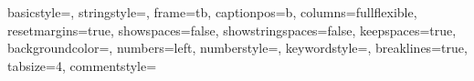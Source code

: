 \usepackage{color}
\usepackage{accsupp}
\usepackage{hyperref}
\usepackage[ngerman]{babel}
\usepackage[latin1]{inputenc} 

\usepackage{listings}
{
  basicstyle=\ttfamily, %
  stringstyle=\color{green}\ttfamily,
  frame=tb, %
  captionpos=b,
  columns=fullflexible, %
  resetmargins=true,
  showspaces=false, %
  showstringspaces=false, %
  keepspaces=true, %
  backgroundcolor=\color{bisque}, %
  numbers=left, %
  numberstyle=\noncopynumber, %
  keywordstyle=\color{blue}, %
  breaklines=true,
  tabsize=4,
  commentstyle=\color{brown}
}
\newcommand{\noncopynumber}[1]{%
    \BeginAccSupp{method=escape,ActualText={}}%
    #1%
    \EndAccSupp{}%
}



